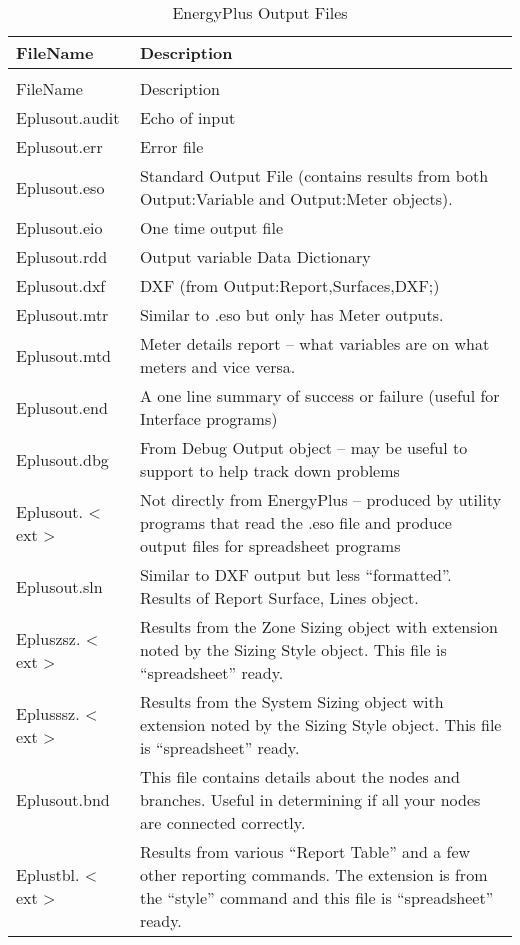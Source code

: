 \begin{longtable}[c]{p{1.5in}p{4.5in}}
\caption{EnergyPlus Output Files \label{table:energyplus-output-files}} \tabularnewline
\toprule 
FileName & Description \tabularnewline
\midrule
\endfirsthead

\caption[]{EnergyPlus Output Files} \tabularnewline
\toprule 
FileName & Description \tabularnewline
\midrule
\endhead

Eplusout.audit & Echo of input \tabularnewline
Eplusout.err & Error file \tabularnewline
Eplusout.eso & Standard Output File (contains results from both Output:Variable and Output:Meter objects). \tabularnewline
Eplusout.eio & One time output file \tabularnewline
Eplusout.rdd & Output variable Data Dictionary \tabularnewline
Eplusout.dxf & DXF (from Output:Report,Surfaces,DXF;) \tabularnewline
Eplusout.mtr & Similar to .eso but only has Meter outputs. \tabularnewline
Eplusout.mtd & Meter details report – what variables are on what meters and vice versa. \tabularnewline
Eplusout.end & A one line summary of success or failure (useful for Interface programs) \tabularnewline
Eplusout.dbg & From Debug Output object – may be useful to support to help track down problems \tabularnewline
Eplusout. < ext > & Not directly from EnergyPlus – produced by utility programs that read the .eso file and produce output files for spreadsheet programs \tabularnewline
Eplusout.sln & Similar to DXF output but less “formatted”. Results of Report Surface, Lines object. \tabularnewline
Epluszsz. < ext > & Results from the Zone Sizing object with extension noted by the Sizing Style object. This file is “spreadsheet” ready. \tabularnewline
Eplusssz. < ext > & Results from the System Sizing object with extension noted by the Sizing Style object. This file is “spreadsheet” ready. \tabularnewline
Eplusout.bnd & This file contains details about the nodes and branches. Useful in determining if all your nodes are connected correctly. \tabularnewline
Eplustbl. < ext > & Results from various “Report Table” and a few other reporting commands. The extension is from the “style” command and this file is “spreadsheet” ready. \tabularnewline
\bottomrule
\end{longtable}
